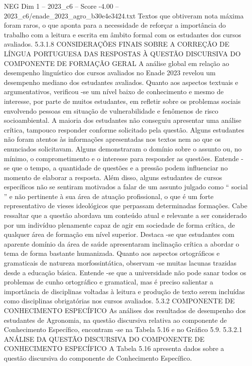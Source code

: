 \begin{textsample}{NEG Dim 1 – 2023\_c6 – Score -4.00 – 2023\_c6/enade\_2023\_agro\_b30e4e3424.txt}
Textos que obtiveram nota máxima foram raros, o que aponta para a necessidade de reforçar a importância do trabalho com a leitura e escrita em âmbito formal com os estudantes dos cursos avaliados. 5.3.1.8 CONSIDERAÇÕES FINAIS SOBRE A CORREÇÃO DE LÍNGUA PORTUGUESA DAS RESPOSTAS À QUESTÃO DISCURSIVA DO COMPONENTE DE FORMAÇÃO GERAL A análise global em relação ao desempenho linguístico dos cursos avaliados no Enade 2023 revelou um desempenho mediano dos estudantes avaliados.
Quanto aos aspectos textuais e argumentativos, verificou -se um nível baixo de conhecimento e mesmo de interesse, por parte de muitos estudantes, em refletir sobre os problemas sociais envolvendo pessoas em situação de vulnerabilidade e fenômenos de risco socioambiental.
A maioria dos estudantes não conseguiu apresentar uma análise crítica, tampouco responder conforme solicitado pela questão.
Alguns estudantes não foram atentos às informações apresentadas nos textos nem ao que os enunciados solicitavam.
Alguns demonstraram o domínio sobre o assunto ou, no mínimo, o comprometimento e o interesse para responder as questões.
Entende -se que o tempo, a quantidade de questões e a pressão podem influenciar no momento de elaborar a resposta.
Além disso, alguns estudantes de cursos específicos não se sentiram motivados a falar de um assunto julgado como “ social ” e não pertinente à sua área de atuação profissional, o que é um forte representativo de vieses ideológicos que perpassam determinadas formações.
Cabe ressaltar que a questão abordava um conteúdo atual e relevante a ser considerado por um indivíduo plenamente capaz de agir em sociedade de forma crítica, de qualquer área de formação em nível superior.
Destaca -se que estudantes com aparente domínio da área de saúde apresentaram inclinação crítica a abordar o tema de forma bastante humanizada.
Quanto aos aspectos ortográficos e gramaticais de natureza morfossintática, observam -se muitas lacunas trazidas desde a educação básica.
Entende -se que a universidade não pode sanar todos os problemas de cunho ortográfico e gramatical, mas é preciso salientar a importância de disciplinas voltadas à leitura e produção de texto serem incluídas como disciplinas obrigatórias nos cursos avaliados. 5.3.2 COMPONENTE DE CONHECIMENTO ESPECÍFICO As análises dos resultados de desempenho dos estudantes de Agronomia, na questão discursiva relativa ao componente de Conhecimento Específico, encontram -se na Tabela 5.16 e no Gráfico 5.9. 5.3.2.1 ANÁLISE DA QUESTÃO DISCURSIVA DO COMPONENTE DE CONHECIMENTO ESPECÍFICO A Tabela 5.16 apresenta dados sobre a questão discursiva do componente de Conhecimento Específico.

\end{textsample}
